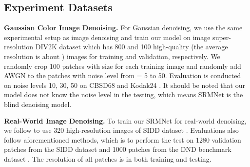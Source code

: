 \documentclass{article}
\begin{document}
\subsection{Experiment Datasets}
\noindent\textbf{Gaussian Color Image Denoising.} For Gaussian denoising, we use the same experimental setup as image denoising \cite{14,15} and train our model on image super-resolution DIV2K \cite{39} dataset which has 800 and 100 high-quality (the average resolution is about ) images for training and validation, respectively. We randomly crop 100 patches with size  for each training image and randomly add AWGN to the patches with noise level from  = 5 to 50. Evaluation is conducted on noise levels 10, 30, 50 on CBSD68 \cite{35} and Kodak24 \cite{36}. It should be noted that our model does not know the noise level in the testing, which means SRMNet is the blind denoising model.

\noindent\textbf{Real-World Image Denoising.} To train our SRMNet for real-world denoising, we follow \cite{20, 30} to use 320 high-resolution images of SIDD dataset \cite{40}. Evaluations also follow aforementioned methods, which is to perform the test on 1280 validation patches from the SIDD dataset \cite{40} and 1000 patches from the DND benchmark dataset \cite{41}. The resolution of all patches is  in both training and testing.
\end{document}
